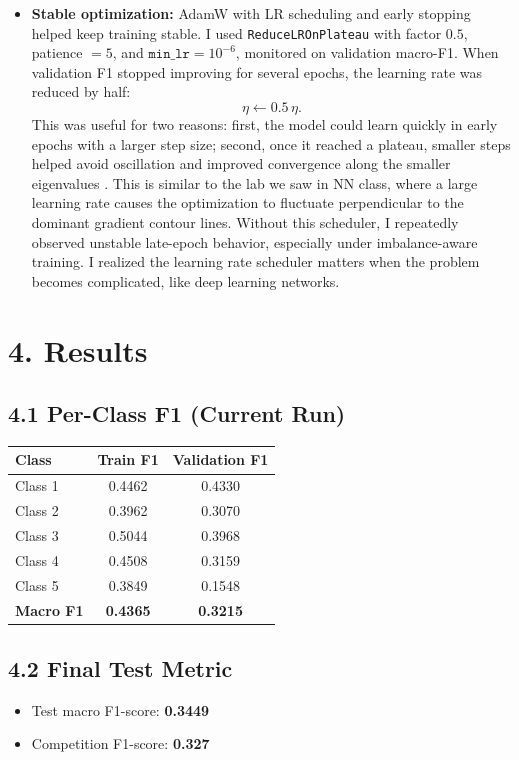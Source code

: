 \documentclass[11pt]{article}
\begin{document}
\begin{itemize}[leftmargin=1.2em]
\item \textbf{Stable optimization:} AdamW with LR scheduling and early stopping helped keep training stable.  
I used \texttt{ReduceLROnPlateau} with factor \(0.5\), patience \(=5\), and \(\texttt{min\_lr}=10^{-6}\), monitored on validation macro-F1.  
When validation F1 stopped improving for several epochs, the learning rate was reduced by half:
\[
\eta \leftarrow 0.5\,\eta .
\]
This was useful for two reasons: first, the model could learn quickly in early epochs with a larger step size; second, once it reached a plateau, smaller steps helped avoid oscillation and improved convergence along the smaller eigenvalues . This is similar to the lab we saw in NN class, where a large learning rate causes the optimization to fluctuate perpendicular to the dominant gradient contour lines.   
Without this scheduler, I repeatedly observed unstable late-epoch behavior, especially under imbalance-aware training. I realized the learning rate scheduler matters when the problem becomes complicated, like deep learning networks.
\end{itemize}

\section*{4. Results}
\subsection*{4.1 Per-Class F1 (Current Run)}
\begin{center}
\begin{tabular}{lcc}
\toprule
\textbf{Class} & \textbf{Train F1} & \textbf{Validation F1} \\
\midrule
Class 1 & 0.4462 & 0.4330 \\
Class 2 & 0.3962 & 0.3070 \\
Class 3 & 0.5044 & 0.3968 \\
Class 4 & 0.4508 & 0.3159 \\
Class 5 & 0.3849 & 0.1548 \\
\midrule
\textbf{Macro F1} & \textbf{0.4365} & \textbf{0.3215} \\
\bottomrule
\end{tabular}
\end{center}

\subsection*{4.2 Final Test Metric}
\begin{itemize}[leftmargin=1.2em]
\item Test macro F1-score:  \textbf{0.3449}
\item Competition F1-score: \textbf{0.327}
\end{itemize}
\end{document}

